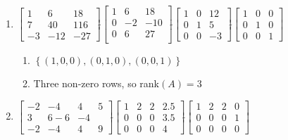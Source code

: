 \documentclass[12pt]{article}
\begin{document}
\begin{enumerate}
\begin{enumerate}
    \end{enumerate}

    \setcounter{enumi}{8}

  \item $\begin{bmatrix} 1 & 6 & 18\\ 7 & 40 & 116\\ -3 & -12 & -27  \end{bmatrix}\widetilde{ }\begin{bmatrix} 1 & 6 & 18\\ 0 & -2 & -10\\ 0 & 6 & 27\\ \end{bmatrix}\widetilde{ }\begin{bmatrix} 1 & 0 & 12\\ 0 & 1 & 5\\ 0 & 0 & -3  \end{bmatrix}\widetilde{ }\begin{bmatrix} 1 & 0 & 0\\ 0 & 1 & 0\\ 0 & 0 & 1  \end{bmatrix}$

    \begin{enumerate}

      \item $\left\{ (1,0,0),(0,1,0),(0,0,1) \right\}$

      \item Three non-zero rows, so rank$(A)=3$

    \end{enumerate}

    \setcounter{enumi}{10}

  \item $\begin{bmatrix} -2 & -4 & 4 & 5\\ 3 & 6 -6 & -4\\ -2 & -4 & 4 & 9  \end{bmatrix}\widetilde{ }\begin{bmatrix} 1 & 2 & 2 & 2.5\\ 0 & 0 & 0 & 3.5\\ 0 & 0 & 0 & 4  \end{bmatrix}\widetilde{ }\begin{bmatrix} 1 & 2 & 2 & 0\\ 0 & 0 & 0 & 1\\ 0 & 0 & 0 & 0\end{bmatrix}$


\end{enumerate}
\end{document}
